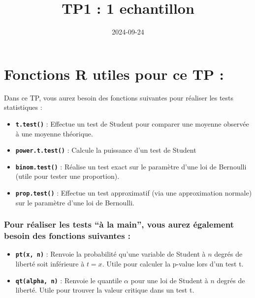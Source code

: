 \documentclass[
]{article}
\title{TP1 : 1 echantillon}
\author{}
\date{\vspace{-2.5em}2024-09-24}
\providecommand{\tightlist}{%
  \setlength{\itemsep}{0pt}\setlength{\parskip}{0pt}}
\begin{document}
\maketitle

\hypertarget{fonctions-r-utiles-pour-ce-tp}{%
\section{Fonctions R utiles pour ce TP
:}\label{fonctions-r-utiles-pour-ce-tp}}

Dans ce TP, vous aurez besoin des fonctions suivantes pour réaliser les
tests statistiques :

\begin{itemize}
\tightlist
\item
  \textbf{\texttt{t.test()}} : Effectue un test de Student pour comparer
  une moyenne observée à une moyenne théorique.
\item
  \textbf{\texttt{power.t.test()}} : Calcule la puissance d'un test de
  Student
\item
  \textbf{\texttt{binom.test()}} : Réalise un test exact sur le
  paramètre d'une loi de Bernoulli (utile pour tester une proportion).
\item
  \textbf{\texttt{prop.test()}} : Effectue un test approximatif (via une
  approximation normale) sur le paramètre d'une loi de Bernoulli.
\end{itemize}

\hypertarget{pour-ruxe9aliser-les-tests-uxe0-la-main-vous-aurez-uxe9galement-besoin-des-fonctions-suivantes}{%
\subsubsection{Pour réaliser les tests ``à la main'', vous aurez
également besoin des fonctions suivantes
:}\label{pour-ruxe9aliser-les-tests-uxe0-la-main-vous-aurez-uxe9galement-besoin-des-fonctions-suivantes}}

\begin{itemize}
\tightlist
\item
  \textbf{\texttt{pt(x,\ n)}} : Renvoie la probabilité qu'une variable
  de Student à \(n\) degrés de liberté soit inférieure à \(t = x\).
  Utile pour calculer la p-value lors d'un test t.
\item
  \textbf{\texttt{qt(alpha,\ n)}} : Renvoie le quantile \(\alpha\) pour
  une loi de Student à \(n\) degrés de liberté. Utile pour trouver la
  valeur critique dans un test t.
\end{itemize}
\end{document}
